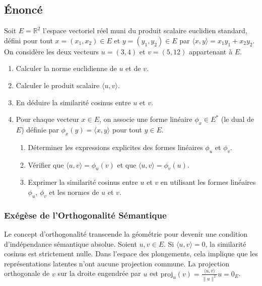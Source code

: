 \documentclass[11pt,a4paper]{report}
\begin{document}
\hypertarget{uxe9noncuxe9}{%
\subsection{Énoncé}\label{uxe9noncuxe9}}

Soit \(E = \mathbb{R}^2\) l'espace vectoriel réel muni du produit
scalaire euclidien standard, défini pour tout \(x = (x_1, x_2) \in E\)
et \(y = (y_1, y_2) \in E\) par
\(\langle x, y \rangle = x_1 y_1 + x_2 y_2\). On considère les deux
vecteurs \(u = (3, 4)\) et \(v = (5, 12)\) appartenant à \(E\).

\begin{enumerate}
\def\labelenumi{\arabic{enumi}.}

\item
  Calculer la norme euclidienne de \(u\) et de \(v\).
\item
  Calculer le produit scalaire \(\langle u, v \rangle\).
\item
  En déduire la similarité cosinus entre \(u\) et \(v\).
\item
  Pour chaque vecteur \(x \in E\), on associe une forme linéaire
  \(\phi_x \in E^*\) (le dual de \(E\)) définie par
  \(\phi_x(y) = \langle x, y \rangle\) pour tout \(y \in E\).

  \begin{enumerate}
  \def\labelenumii{\alph{enumii}.}

  \item
    Déterminer les expressions explicites des formes linéaires
    \(\phi_u\) et \(\phi_v\).
  \item
    Vérifier que \(\langle u, v \rangle = \phi_u(v)\) et que
    \(\langle u, v \rangle = \phi_v(u)\).
  \item
    Exprimer la similarité cosinus entre \(u\) et \(v\) en utilisant les
    formes linéaires \(\phi_u\), \(\phi_v\) et les normes de \(u\) et
    \(v\).
  \end{enumerate}
\end{enumerate}

\hypertarget{exuxe9guxe8se-de-lorthogonalituxe9-suxe9mantique}{%
\subsubsection{Exégèse de l'Orthogonalité
Sémantique}\label{exuxe9guxe8se-de-lorthogonalituxe9-suxe9mantique}}

Le concept d'orthogonalité transcende la géométrie pour devenir une
condition d'indépendance sémantique absolue. Soient \(u, v \in E\). Si
\(\langle u, v \rangle = 0\), la similarité cosinus est strictement
nulle. Dans l'espace des plongements, cela implique que les
représentations latentes n'ont aucune projection commune. La projection
orthogonale de \(v\) sur la droite engendrée par \(u\) est
\(\text{proj}_u(v) = \frac{\langle u, v \rangle}{\|u\|^2} u = 0_E\).
\end{document}
